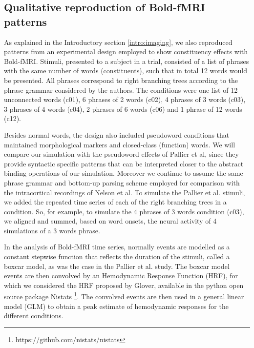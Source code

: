 \documentclass[10pt]{article}
\begin{document}
\subsection{Qualitative reproduction of Bold-fMRI patterns}
{\label{sec:pnas-patterns}}

As explained in the Introductory section \ref{intro:imaging}, we also reproduced patterns from an experimental design employed to show constituency effects with Bold-fMRI\cite{Pallier_2011}. 
Stimuli, presented to a subject in a trial, consisted of a list of phrases with the same number of words (constituents), such that in total 12 words would be presented.
All phrases correspond to right branching trees according to the phrase grammar considered by the authors.
The conditions were one list of 12 unconnected words (c01), 6 phrases of 2 words (c02), 4 phrases of 3 words (c03), 3 phrases of 4 words (c04), 2 phrases of 6 words (c06) and 1 phrase of 12 words (c12).

Besides normal words, the design also included pseudoword conditions that maintained morphological markers and closed-class (function) words.
We will compare our simulation with the pseudoword effects of Pallier et al, since they provide syntactic specific patterns that can be interpreted closer to the abstract binding operations of our simulation.
Moreover we continue to assume the same phrase grammar and bottom-up parsing scheme employed for comparison with the intracortical recordings of Nelson et al.
To simulate the Pallier et al. stimuli, we added the repeated time series of each of the right branching trees in a condition.
So, for example, to simulate the 4 phrases of 3 words condition (c03), we aligned and summed, based on word onsets, the neural activity of 4 simulations of a 3 words phrase.

In the analysis of Bold-fMRI time series, normally events are modelled as a constant stepwise function that reflects the duration of the stimuli, called a boxcar model, as was the case in the Pallier et al. study.
The boxcar model events are then convolved by an Hemodynamic Response Function (HRF), for which we considered the HRF proposed by Glover\cite{Glover_1999}, available in the python open source package Nistats \footnote{https://github.com/nistats/nistats}.
The convolved events are then used in a general linear model (GLM) to obtain a peak estimate of hemodynamic responses for the different conditions.
\end{document}
